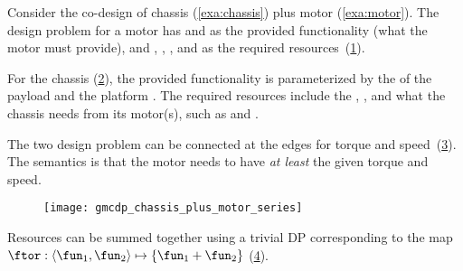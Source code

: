 \begin{example}
  \label{exa:chassis_plus_motor}Consider the co-design of chassis (\cref{exa:chassis})
  plus motor (\cref{exa:motor}). The design problem for a motor has 
  and  as the provided functionality (what the motor must
  provide), and , , , and 
  as the required resources~(\cref{fig:motor}).

  \begin{figure}[h]
    \centering
    \caption{\label{fig:motor}}
  \end{figure}


  \noindent For the chassis (\cref{fig:gmcdp_chassis}), the provided
  functionality is parameterized by the  of the payload and
  the platform . The required resources include the ,
  , and what the chassis needs from its motor(s), such
  as  and .

  \begin{figure}[h]
    \centering
    \caption{\label{fig:gmcdp_chassis}}
  \end{figure}


  \noindent The two design problem can be connected at the edges for
  torque and speed~(\cref{fig:gmcdp_chassis_plus_motor_series}). The
  semantics is that the motor needs to have\emph{ at least }the given
  torque and speed.

  \begin{figure}[h]
    \centering
    \texttt{[image: gmcdp\_chassis\_plus\_motor\_series]}
    \caption{\label{fig:gmcdp_chassis_plus_motor_series}}
  \end{figure}


  Resources can be summed together using a trivial DP corresponding
  to the map $\ftor:\left\langle \fun_{1},\fun_{2}\right\rangle \mapsto\{\fun_{1}+\fun_{2}\}$
  (\cref{fig:total_cost}).

  \begin{figure}[h]
    \centering
    \caption{\label{fig:total_cost}}
  \end{figure}



\end{example}
